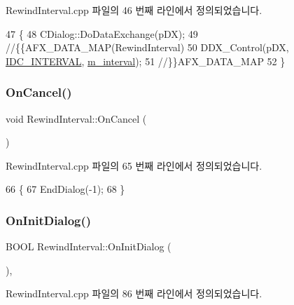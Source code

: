 Rewind\+Interval.\+cpp 파일의 46 번째 라인에서 정의되었습니다.


\begin{DoxyCode}
47 \{
48   CDialog::DoDataExchange(pDX);
49   \textcolor{comment}{//\{\{AFX\_DATA\_MAP(RewindInterval)}
50   DDX\_Control(pDX, \mbox{\hyperlink{resource_8h_a27c6caf81457fc3e3bf1c720a6566749}{IDC\_INTERVAL}}, \mbox{\hyperlink{class_rewind_interval_a67355ee1278bb5827beca804a2e2fcb5}{m\_interval}});
51   \textcolor{comment}{//\}\}AFX\_DATA\_MAP}
52 \}
\end{DoxyCode}
\mbox{\label{class_rewind_interval_a8aecd163bdd5ac7472b24976de094fcc}} 
\subsubsection{\texorpdfstring{On\+Cancel()}{OnCancel()}}
{\footnotesize\ttfamily void Rewind\+Interval\+::\+On\+Cancel (\begin{DoxyParamCaption}{ }\end{DoxyParamCaption})\hspace{0.3cm}{\ttfamily [protected]}}



Rewind\+Interval.\+cpp 파일의 65 번째 라인에서 정의되었습니다.


\begin{DoxyCode}
66 \{
67   EndDialog(-1);
68 \}
\end{DoxyCode}
\mbox{\label{class_rewind_interval_ad108898e1ce2a68db6e1478225e8f842}} 
\subsubsection{\texorpdfstring{On\+Init\+Dialog()}{OnInitDialog()}}
{\footnotesize\ttfamily B\+O\+OL Rewind\+Interval\+::\+On\+Init\+Dialog (\begin{DoxyParamCaption}{ }\end{DoxyParamCaption})\hspace{0.3cm}{\ttfamily [protected]}, {\ttfamily [virtual]}}



Rewind\+Interval.\+cpp 파일의 86 번째 라인에서 정의되었습니다.



